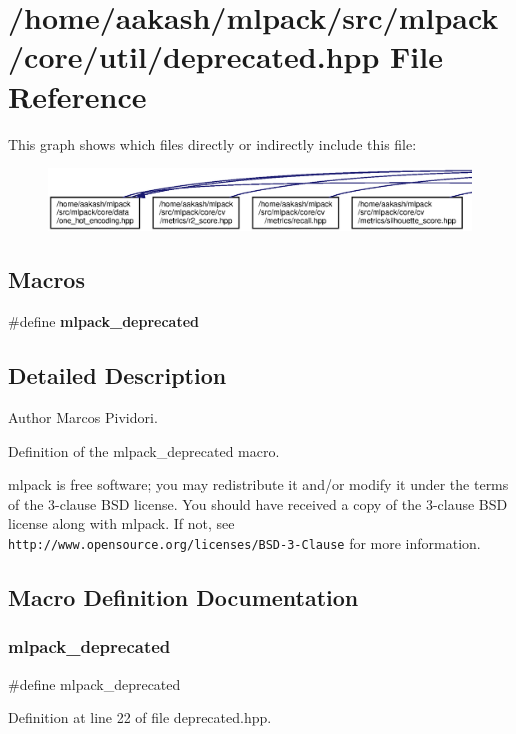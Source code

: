 \section{/home/aakash/mlpack/src/mlpack/core/util/deprecated.hpp File Reference}
\label{deprecated_8hpp}
This graph shows which files directly or indirectly include this file\+:
\nopagebreak
\begin{figure}[H]
\begin{center}
\leavevmode
\includegraphics[width=350pt]{deprecated_8hpp__dep__incl}
\end{center}
\end{figure}
\subsection*{Macros}
\begin{DoxyCompactItemize}
\item 
\#define \textbf{ mlpack\+\_\+deprecated}
\end{DoxyCompactItemize}


\subsection{Detailed Description}
\begin{DoxyAuthor}{Author}
Marcos Pividori.
\end{DoxyAuthor}
Definition of the mlpack\+\_\+deprecated macro.

mlpack is free software; you may redistribute it and/or modify it under the terms of the 3-\/clause B\+SD license. You should have received a copy of the 3-\/clause B\+SD license along with mlpack. If not, see {\tt http\+://www.\+opensource.\+org/licenses/\+B\+S\+D-\/3-\/\+Clause} for more information. 

\subsection{Macro Definition Documentation}
\mbox{\label{deprecated_8hpp_a3d7d5df477a8805980e43e423e18a525}} 
\subsubsection{mlpack\+\_\+deprecated}
{\footnotesize\ttfamily \#define mlpack\+\_\+deprecated}



Definition at line 22 of file deprecated.\+hpp.

